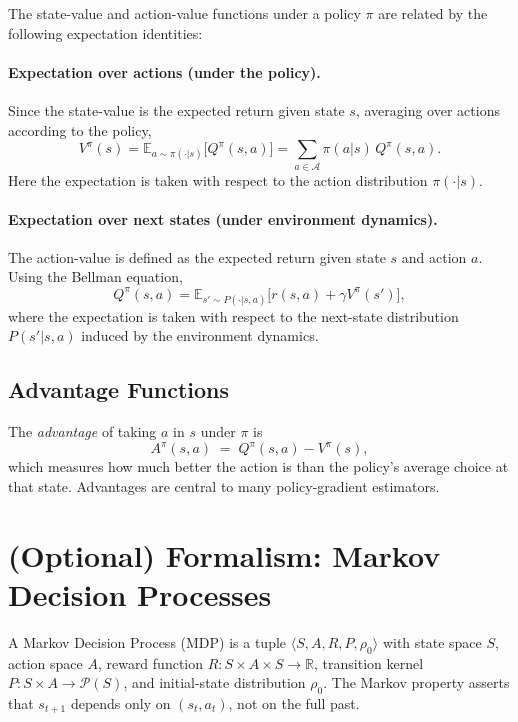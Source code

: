 The state-value and action-value functions under a policy $\pi$ are related by the following expectation identities:

\paragraph{Expectation over actions (under the policy).}
Since the state-value is the expected return given state $s$, averaging over actions according to the policy,
\begin{equation}
    V^\pi(s) 
    = \mathbb{E}_{a \sim \pi(\cdot|s)}\big[ Q^\pi(s,a) \big]
    = \sum_{a \in \mathcal{A}} \pi(a|s)\, Q^\pi(s,a).
\end{equation}
Here the expectation is taken with respect to the action distribution $\pi(\cdot|s)$.

\paragraph{Expectation over next states (under environment dynamics).}
The action-value is defined as the expected return given state $s$ and action $a$. Using the Bellman equation,
\begin{equation}
    Q^\pi(s,a) 
    = \mathbb{E}_{s' \sim P(\cdot|s,a)}\big[ r(s,a) + \gamma V^\pi(s') \big],
\end{equation}
where the expectation is taken with respect to the next-state distribution 
$P(s'|s,a)$ induced by the environment dynamics.


\subsection{Advantage Functions}
The \emph{advantage} of taking $a$ in $s$ under $\pi$ is
\[
A^{\pi}(s,a) \;=\; Q^{\pi}(s,a) - V^{\pi}(s),
\]
which measures how much better the action is than the policy’s average choice at that state. Advantages are central to many policy-gradient estimators. \cite{spinningup_rl_intro}

\section{(Optional) Formalism: Markov Decision Processes}
A Markov Decision Process (MDP) is a tuple $\langle S,A,R,P,\rho_0\rangle$ with state space $S$, action space $A$, reward function $R:S\times A\times S\to\mathbb{R}$, transition kernel $P:S\times A\to\mathcal{P}(S)$, and initial-state distribution $\rho_0$. The Markov property asserts that $s_{t+1}$ depends only on $(s_t,a_t)$, not on the full past. \cite{spinningup_rl_intro}

